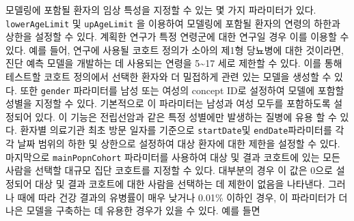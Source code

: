 \documentclass[10.5pt]{book}
\theoremstyle{definition}
\theoremstyle{definition}
\theoremstyle{definition}
\theoremstyle{remark}
\begin{document}
모델링에 포함될 환자의 임상 특성을 지정할 수 있는 몇 가지 파라미터가
있다. \texttt{lowerAgeLimit} 및 \texttt{upAgeLimit} 을 이용하여 모델링에
포함될 환자의 연령의 하한과 상한을 설정할 수 있다. 계획한 연구가 특정
연령군에 대한 연구일 경우 이를 이용할 수 있다. 예를 들어, 연구에 사용될
코호트 정의가 소아의 제1형 당뇨병에 대한 것이라면, 진단 예측 모델을
개발하는 데 사용되는 연령을 5\textasciitilde{}17 세로 제한할 수 있다.
이를 통해 테스트할 코호트 정의에서 선택한 환자와 더 밀접하게 관련 있는
모델을 생성할 수 있다. 또한 \texttt{gender} 파라미터를 남성 또는 여성의
concept ID로 설정하여 모델에 포함할 성별을 지정할 수 있다. 기본적으로 이
파라미터는 남성과 여성 모두를 포함하도록 설정되어 있다. 이 기능은
전립선암과 같은 특정 성별에만 발생하는 질병에 유용 할 수 있다. 환자별
의료기관 최초 방문 일자를 기준으로 \texttt{startDate}및
\texttt{endDate}파라미터를 각각 날짜 범위의 하한 및 상한으로 설정하여
대상 환자에 대한 제한을 설정할 수 있다. 마지막으로
\texttt{mainPopnCohort} 파라미터를 사용하여 대상 및 결과 코호트에 있는
모든 사람을 선택할 대규모 집단 코호트를 지정할 수 있다. 대부분의 경우 이
값은 0으로 설정되어 대상 및 결과 코호트에 대한 사람을 선택하는 데 제한이
없음을 나타낸다. 그러나 때에 따라 건강 결과의 유병률이 매우 낮거나
0.01\% 이하인 경우, 이 파라미터가 더 나은 모델을 구축하는 데 유용한
경우가 있을 수 있다. 예를 들면
\end{document}
